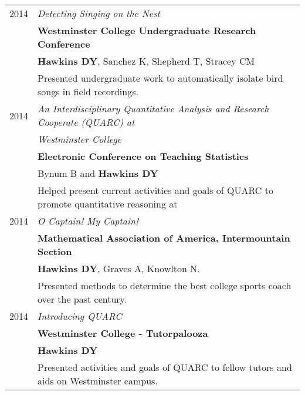 \documentclass[a4paper,10pt]{report}
\begin{document}
\begin{longtable}{ll}
	\textsc{2014} & \emph{Detecting Singing on the Nest}                                                                \\
	              & \textbf{Westminster College Undergraduate Research Conference}                                      \\
	              & \footnotesize \textbf{Hawkins DY}, Sanchez K, Shepherd T, Stracey CM                                \\
	              & \small{
		Presented undergraduate work to automatically isolate bird songs in
	field recordings.}                                                                                                  \\

	\textsc{2014} & \emph{An Interdisciplinary Quantitative Analysis and Research Cooperate (QUARC) at}                 \\
	              & \emph{Westminster College}                                                                          \\
	              & \textbf{Electronic Conference on Teaching Statistics}                                               \\
	              & \footnotesize Bynum B and \textbf{Hawkins DY}                                                       \\
	              & \small{Helped present current activities and goals of QUARC to promote quantitative reasoning at}   \\

	\textsc{2014} & \emph{O Captain! My Captain!}                                                                       \\
	              & \textbf{Mathematical Association of America, Intermountain Section}                                 \\
	              & \footnotesize \textbf{Hawkins DY}, Graves A, Knowlton N.                                            \\
	              & \small{Presented methods to determine the best college sports coach over
	the past century.}                                                                                                  \\

	\textsc{2014} & \emph{Introducing QUARC}                                                                            \\
	              & \textbf{Westminster College - Tutorpalooza}                                                         \\
	              & \footnotesize \textbf{Hawkins DY}                                                                   \\
	              & \small{Presented activities and goals of QUARC to fellow tutors and aids on Westminster campus.}    \\


\end{longtable}
\end{document}
